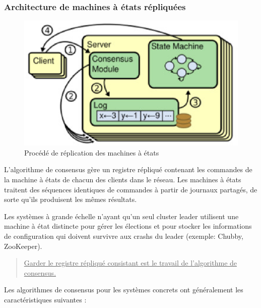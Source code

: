 \subsubsection{Architecture de machines à états répliquées}

\begin{figure}[H]
    \centerline{\includegraphics[width=.37\textwidth]{img/replicated_state_machine}}
    \caption{Procédé de réplication des machines à états}
    \label{replicated_state_machine}
\end{figure}

L'algorithme de consensus gère un registre répliqué contenant les commandes de
la machine à états de chacun des clients dans le réseau. Les machines à états
traitent des séquences identiques de commandes à partir de journaux partagés, de
sorte qu'ils produisent les mêmes résultats.

Les systèmes à grande échelle n'ayant qu'un seul cluster leader utilisent une
machine à état distincte pour gérer les élections et pour stocker les
informations de configuration qui doivent survivre aux crashs du leader
(exemple: Chubby, ZooKeeper).

\begin{verse}
    \underline{
        Garder le registre répliqué consistant est le travail de l'algorithme de
        consensus.
    }
\end{verse}

Les algorithmes de consensus pour les systèmes concrets ont généralement les
caractéristiques suivantes :

